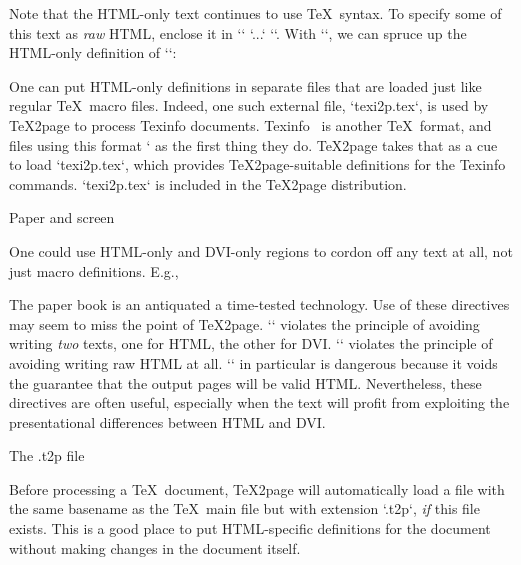 \begintt
\ifx\shipout\UnDeFiNeD %
  \def\bull{{\bf *}}
\fi
\endtt

Note that the HTML-only text continues to use \TeX\ syntax.
To specify some of this text as {\em raw} HTML, enclose it
in `\rawhtml` `...` `\endrawhtml`.   With
`\rawhtml`, we can
spruce up the
HTML-only definition of `\bull`:

\begintt
\ifx\shipout\UnDeFiNeD %
  \htmlonly
  \def\bull{{\bf
  \rawhtml<span style="color: #990000">&spades;</span>\endrawhtml
  }}
  \endhtmlonly
\fi
\endtt

One can put HTML-only definitions in separate files
that are loaded just like regular \TeX\ macro files.
Indeed, one such external file, `texi2p.tex`, is used
by \TeX2page to process Texinfo
documents.  Texinfo~\cite{texinfo} is another \TeX\
format, and files using this format `
as the first thing they do.  \TeX2page takes that as a
cue to
load `texi2p.tex`, which provides \TeX2page-suitable
definitions for the Texinfo commands.  `texi2p.tex`
is included in the \TeX2page distribution.

\beginsection Paper and screen

One could use HTML-only and DVI-only regions to cordon off
any text at all, not just macro definitions.  E.g.,

\begintt
The paper book is
\ifx\shipout\UnDeFiNeD %
an antiquated
\else %
a time-tested
\fi
technology.
\endtt
Use of these directives may seem to miss the point of
\TeX2page.  `\ifx\shipout\UnDeFiNeD` violates the
principle of avoiding  writing {\em two} texts, one
for HTML, the other for DVI.  `\rawhtml` violates the
principle of avoiding writing raw HTML at all.
`\rawhtml` in particular is dangerous because it voids
the guarantee that the output pages will be valid HTML.
Nevertheless, these directives are often useful, especially when the
text will profit from exploiting the presentational differences between
HTML and DVI.

\beginsection The {.t2p} file

%
Before processing a \TeX\ document, \TeX2page will
automatically load a file
with the same basename as the \TeX\ main file but with
extension `.t2p`, {\em if} this file exists.  This
is a good place to put HTML-specific definitions for
the document without making  changes in the document
itself.

